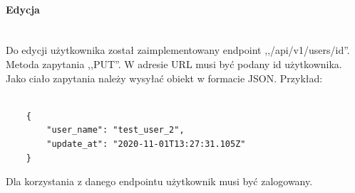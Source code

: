 \paragraph{Edycja}\mbox{}\\

Do edycji użytkownika został zaimplementowany endpoint ,,/api/v1/users/{id}''.
Metoda zapytania ,,PUT''.
W adresie URL musi być podany id użytkownika.
Jako ciało zapytania należy wysyłać obiekt w formacie JSON. Przykład:
\begin{lstlisting}[basicstyle=\tiny\ttfamily]

    {
        "user_name": "test_user_2",
        "update_at": "2020-11-01T13:27:31.105Z"
    }
\end{lstlisting}
Dla korzystania z danego endpointu użytkownik musi być zalogowany.

